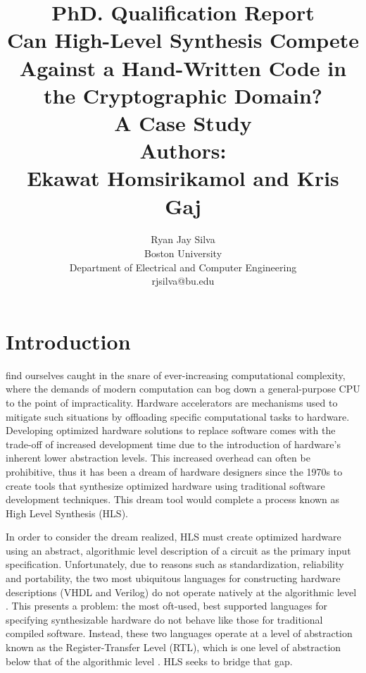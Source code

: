 \documentclass[12pt,journal,compsoc,onecolumn]{IEEEtran}
\begin{document}
\title{PhD. Qualification Report \\ \LARGE{\textbf{Can High-Level Synthesis Compete Against a Hand-Written Code in the Cryptographic Domain? \\ A Case Study \cite{sel}}} \\ Authors: \\ Ekawat Homsirikamol and Kris Gaj}

\author{Ryan Jay Silva \\ Boston University \\ Department of Electrical and Computer Engineering \\ rjsilva@bu.edu
}

\maketitle
\IEEEdisplaynontitleabstractindextext
\IEEEpeerreviewmaketitle


\section{Introduction}

 find ourselves caught in the snare of ever-increasing computational complexity, where the demands of modern computation can bog down a general-purpose CPU to the point of impracticality\cite{skalicky}. Hardware accelerators are mechanisms used to mitigate such situations by offloading specific computational tasks to hardware. Developing optimized hardware solutions to replace software comes with the trade-off of increased development time due to the introduction of hardware's inherent lower abstraction levels. This increased overhead can often be prohibitive, thus it has been a dream of hardware designers since the 1970s to create tools that synthesize optimized hardware using traditional software development techniques\cite{1}. This dream tool would complete a process known as High Level Synthesis (HLS).

In order to consider the dream realized, HLS must create optimized hardware using an abstract, algorithmic level description of a circuit as the primary input specification\cite{mcfarland}. Unfortunately, due to reasons such as standardization\cite{ieee}, reliability\cite{tosun} and portability\cite{churtl}, the two most ubiquitous languages for constructing hardware descriptions (VHDL and Verilog) do not operate natively at the algorithmic level \cite{Harris+Harris}. This presents a problem: the most oft-used, best supported languages for specifying synthesizable hardware do not behave like those for traditional compiled software. Instead, these two languages operate at a level of abstraction known as the Register-Transfer Level (RTL), which is one level of abstraction below that of the algorithmic level \cite{vahid}. HLS seeks to bridge that gap.
\end{document}
